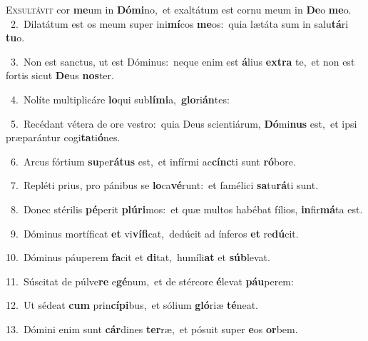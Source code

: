 \lettrine{\initial\textcolor{\initialcolor}{E}}{xsultávit} cor \textbf{me}\-um in \textbf{Dó}\-\textbf{mi}no,~\star et exaltátum est cornu meum in \textbf{De}\-o \textbf{me}\-o.\\
{\numbfont\textcolor{\numbcolor}{~2.}}~Dilatátum est os meum super ini\-\textbf{mí}\-cos \textbf{me}\-os:~\star quia lætáta sum in salu\-\textbf{tá}\-ri \textbf{tu}\-o.\par
{\numbfont\textcolor{\numbcolor}{~3.}}~Non est sanctus, ut est Dóminus:~\dagger neque enim est \textbf{á}\-lius \textbf{ex}\-\textbf{tra} te,~\star et non est fortis sicut \textbf{De}\-us \textbf{nos}\-ter.\par
{\numbfont\textcolor{\numbcolor}{~4.}}~Nolíte multiplicáre \textbf{lo}\-qui sub\-\textbf{lí}\-\textbf{mi}a,~\star \textbf{glo}\-ri\-\textbf{án}\-tes:\par
{\numbfont\textcolor{\numbcolor}{~5.}}~Recédant vétera de ore vestro:~\dagger quia Deus scientiárum, \textbf{Dó}\-mi\textbf{nus} est,~\star et ipsi præparántur cogi\-\textbf{ta}\-ti\-\textbf{ó}\-nes.\par
{\numbfont\textcolor{\numbcolor}{~6.}}~Arcus fórtium \textbf{su}\-pe\-\textbf{rá}\-\textbf{tus} est,~\star et infírmi ac\-\textbf{cínc}\-ti sunt \textbf{ró}\-bore.\par
{\numbfont\textcolor{\numbcolor}{~7.}}~Repléti prius, pro pánibus se \textbf{lo}\-ca\-\textbf{vé}\-runt:~\star et famélici \textbf{sa}\-tu\-\textbf{rá}\-ti sunt.\par
{\numbfont\textcolor{\numbcolor}{~8.}}~Donec stérilis \textbf{pé}\-perit \textbf{plú}\-\textbf{ri}mos:~\star et quæ multos habébat fílios, \textbf{in}\-fir\-\textbf{má}\-ta est.\par
{\numbfont\textcolor{\numbcolor}{~9.}}~Dóminus mortíficat \textbf{et} vi\-\textbf{ví}\-\textbf{fi}cat,~\star dedúcit ad ínferos \textbf{et} re\-\textbf{dú}\-cit.\par
{\numbfont\textcolor{\numbcolor}{10.}}~Dóminus páuperem \textbf{fa}\-cit et \textbf{di}\-tat,~\star humíli\textbf{at} et \textbf{súb}\-levat.\par
{\numbfont\textcolor{\numbcolor}{11.}}~Súscitat de púlve\textbf{re} e\-\textbf{gé}\-num,~\star et de stércore \textbf{é}\-levat \textbf{páu}\-perem:\par
{\numbfont\textcolor{\numbcolor}{12.}}~Ut sédeat \textbf{cum} prin\-\textbf{cí}\-\textbf{pi}bus,~\star et sólium \textbf{gló}\-riæ \textbf{té}\-neat.\par
{\numbfont\textcolor{\numbcolor}{13.}}~Dómini enim sunt \textbf{cár}\-dines \textbf{ter}\-ræ,~\star et pósuit super \textbf{e}\-os \textbf{or}\-bem.\par
